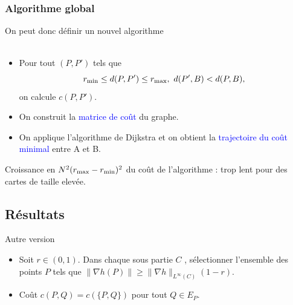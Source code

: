 \documentclass[11pt]{beamer}
\begin{document}
\begin{frame}
\frametitle{Algorithme global}
On peut donc définir un nouvel algorithme\\
~\\
\begin{itemize}
\item Pour tout $(P, P')$ tels que
  \[
  r_{\rm min} \le d(P, P') \le r_{\rm max}, \ d(P', B) < d(P, B),
  \]
  on calcule $c(P,P')$.
\item On construit la \textcolor{blue}{matrice de coût} du graphe.
\item On applique l'algorithme de Dijkstra et on obtient la \textcolor{blue}{trajectoire du coût minimal} entre A et B.
\end{itemize}

\vfill
Croissance en $ N^2(r_{\rm max} - r_{\rm min})^2$ du coût de l'algorithme : trop lent pour des cartes de taille elevée.
\end{frame}
\subsection{Résultats}
\begin{frame}{Autre version}
\begin{center}
\end{center}




\begin{itemize}
\item Soit $r\in (0,1)$. Dans chaque sous partie $C$ , sélectionner l'ensemble des points $P$ tels que $\|\nabla h(P)\|\geq \|\nabla h\|_{\mathit{L}^\infty(C)}(1-r)$.
\item Coût $c(P,Q)=c(\{P,Q\})$ pour tout $Q\in E_P$.
\end{itemize}
\end{frame}
\end{document}
